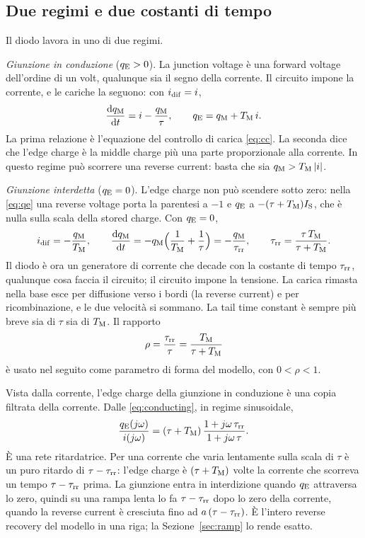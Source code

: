 \documentclass[10pt,a4paper]{scrartcl}
\let\newcommand\pdvaluedefine
\newcommand{\taurr}{\tau_\mathrm{rr}}
\newcommand{\TM}{T_\mathrm{M}}
\newcommand{\qE}{q_\mathrm{E}}
\newcommand{\qM}{q_\mathrm{M}}
\newcommand{\idif}{i_\mathrm{dif}}
\newcommand{\IS}{I_\mathrm{S}}
\newcommand{\diff}{\mathrm{d}}
\begin{document}
\subsection{Due regimi e due costanti di tempo}
\label{sec:regimes}
Il diodo lavora in uno di due regimi.

\emph{Giunzione in conduzione} ($\qE > 0$). La junction voltage è una forward voltage dell'ordine di un volt, qualunque sia il segno della corrente. Il circuito impone la corrente, e le cariche la seguono: con $\idif = i$,
\begin{equation}
\frac{\diff \qM}{\diff t} = i - \frac{\qM}{\tau} , \qquad \qE = \qM + \TM\, i .
\label{eq:conducting}
\end{equation}
La prima relazione è l'equazione del controllo di carica \eqref{eq:cc}. La seconda dice che l'edge charge è la middle charge più una parte proporzionale alla corrente. In questo regime può scorrere una reverse current: basta che sia $\qM > \TM\,|i|$.

\emph{Giunzione interdetta} ($\qE = 0$). L'edge charge non può scendere sotto zero: nella \eqref{eq:qe} una reverse voltage porta la parentesi a $-1$ e $\qE$ a $-(\tau+\TM)\IS$, che è nulla sulla scala della stored charge. Con $\qE = 0$,
\begin{equation}
\idif = -\frac{\qM}{\TM} , \qquad \frac{\diff\qM}{\diff t} = -\qM\Bigl(\frac1\TM + \frac1\tau\Bigr) = -\frac{\qM}{\taurr} , \qquad \taurr = \frac{\tau\,\TM}{\tau+\TM} .
\label{eq:blocked}
\end{equation}
Il diodo è ora un generatore di corrente che decade con la costante di tempo $\taurr$, qualunque cosa faccia il circuito; il circuito impone la tensione. La carica rimasta nella base esce per diffusione verso i bordi (la reverse current) e per ricombinazione, e le due velocità si sommano. La tail time constant è sempre più breve sia di $\tau$ sia di $\TM$. Il rapporto
\begin{equation}
\rho = \frac{\taurr}{\tau} = \frac{\TM}{\tau+\TM}
\label{eq:rho}
\end{equation}
è usato nel seguito come parametro di forma del modello, con $0 < \rho < 1$.

Vista dalla corrente, l'edge charge della giunzione in conduzione è una copia filtrata della corrente. Dalle \eqref{eq:conducting}, in regime sinusoidale,
\begin{equation}
\frac{\qE(j\omega)}{i(j\omega)} = (\tau+\TM)\,\frac{1+j\omega\,\taurr}{1+j\omega\,\tau} .
\label{eq:filter}
\end{equation}
È una rete ritardatrice. Per una corrente che varia lentamente sulla scala di $\tau$ è un puro ritardo di $\tau-\taurr$: l'edge charge è $(\tau+\TM)$ volte la corrente che scorreva un tempo $\tau-\taurr$ prima. La giunzione entra in interdizione quando $\qE$ attraversa lo zero, quindi su una rampa lenta lo fa $\tau-\taurr$ dopo lo zero della corrente, quando la reverse current è cresciuta fino ad $a\,(\tau-\taurr)$. È l'intero reverse recovery del modello in una riga; la Sezione~\ref{sec:ramp} lo rende esatto.
\end{document}
